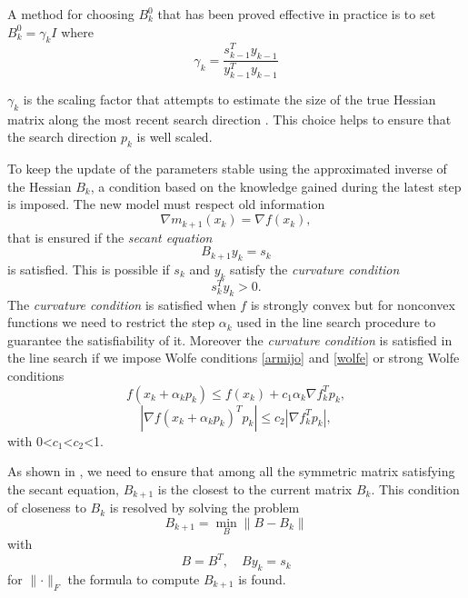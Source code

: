 A method for choosing $B^0_{k}$ that has been proved effective in practice is to set $B^0_{k}=\gamma_{k}I$  where 
\begin{equation}
\gamma_{k}= \frac{s^T_{k-1}y_{k-1}}{y^T_{k-1}y_{k-1}}
\end{equation}

$\gamma_{k}$ is the scaling factor that attempts to estimate the size of the true Hessian matrix along the most recent search direction \cite{numerical}. This choice helps to ensure that the search direction $p_{k}$ is well scaled.

To keep the update of the parameters stable using the approximated inverse of the Hessian $B_{k}$, a condition based on the knowledge gained during the latest step is imposed. The new model must respect old information 
\begin{equation}
\label{LBFGS-FirstCondition}
\nabla m_{k+1}(x_{k})=\nabla f(x_{k}),
\end{equation}
that is ensured if the \textit{secant equation}
\label{secant-equation}
\begin{equation}
B_{k+1}y_{k}=s_{k}
\end{equation}
is satisfied. This is possible if $s_{k}$ and $y_{k}$ satisfy the \textit{curvature condition} 
\begin{equation}
s_{k}^T y_{k}>0.
\end{equation}
The \textit{curvature condition} is satisfied when $f$ is strongly convex but for nonconvex functions we need to restrict the step $\alpha_{k}$ used in the line search procedure to guarantee the satisfiability of it.
Moreover the \textit{curvature condition} is satisfied in the line search if we impose Wolfe conditions \ref{armijo} and \ref{wolfe}
or strong Wolfe conditions
\begin{equation}
f(x_k + \alpha_kp_k ) \leq f (x_k ) + c_1 \alpha_k \nabla f_k^T p_k,
\end{equation}
\begin{equation}
|\nabla f(x_k + \alpha_{k} p_k )^T p_k| \leq c_2 |\nabla f_k^T p_k| ,
\end{equation}
with 0<$c_1$<$c_2$<1. 

As shown in \cite{numerical}, we need to ensure that among all the symmetric matrix satisfying the secant equation, $B_{k+1}$ is the closest to the current matrix $
B_{k}$. This condition of closeness to $B_{k}$ is resolved by solving the problem
\begin{equation}
B_{k+1} = \min_{B} \parallel B - B_{k} \parallel
\end{equation}
with 
\begin{equation}
B = B^T, \quad B{y_{k}}= s_{k}
\end{equation}
for $\parallel \cdot \parallel_{F} $ the formula to compute $B_{k+1}$ is found.


